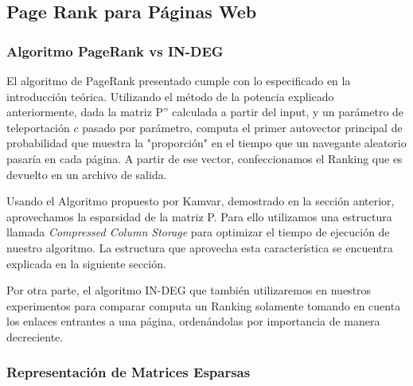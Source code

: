 \subsection{Page Rank para Páginas Web}

\subsubsection{Algoritmo PageRank vs IN-DEG}

\par El algoritmo de PageRank presentado cumple con lo especificado en la introducción teórica. Utilizando el método de la potencia explicado anteriormente, dada la matriz P'' calculada a partir del input, y un parámetro de teleportación $c$ pasado por parámetro, computa el primer autovector principal de probabilidad que muestra la "proporción" en el tiempo que un navegante aleatorio pasaría en cada página. A partir de ese vector, confeccionamos el Ranking que es devuelto en un archivo de salida.

\par Usando el Algoritmo propuesto por Kamvar, demostrado en la sección anterior, aprovechamos la esparsidad de la matriz P. Para ello utilizamos una estructura llamada \textit{Compressed Column Storage} para optimizar el tiempo de ejecución de nuestro algoritmo. La estructura que aprovecha esta característica se encuentra explicada en la siguiente sección.

\par Por otra parte, el algoritmo IN-DEG que también utilizaremos en nuestros experimentos para comparar computa un Ranking solamente tomando en cuenta los enlaces entrantes a una página, ordenándolas por importancia de manera decreciente.

	
\subsubsection{Representación de Matrices Esparsas}


